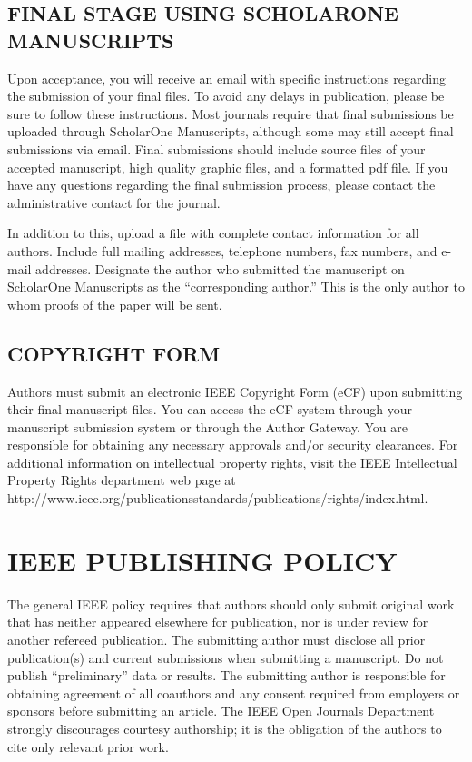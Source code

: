 \documentclass{ieeeojpel}
\begin{document}
\subsection{FINAL STAGE USING SCHOLARONE MANUSCRIPTS}
Upon acceptance, you will receive an email with specific instructions 
regarding the submission of your final files. To avoid any delays in 
publication, please be sure to follow these instructions. Most journals 
require that final submissions be uploaded through ScholarOne Manuscripts, 
although some may still accept final submissions via email. Final 
submissions should include source files of your accepted manuscript, high 
quality graphic files, and a formatted pdf file. If you have any questions 
regarding the final submission process, please contact the administrative 
contact for the journal. 

In addition to this, upload a file with complete contact information for all 
authors. Include full mailing addresses, telephone numbers, fax numbers, and 
e-mail addresses. Designate the author who submitted the manuscript on 
ScholarOne Manuscripts as the ``corresponding author.'' This is the only 
author to whom proofs of the paper will be sent. 

\subsection{COPYRIGHT FORM}
Authors must submit an electronic IEEE Copyright Form (eCF) upon submitting 
their final manuscript files. You can access the eCF system through your 
manuscript submission system or through the Author Gateway. You are 
responsible for obtaining any necessary approvals and/or security 
clearances. For additional information on intellectual property rights, 
visit the IEEE Intellectual Property Rights department web page at 
http://www.ieee.org/publications\textunderscore\discretionary{}{}{}standards/publications/rights/index.html. 

\section{IEEE PUBLISHING POLICY}
The general IEEE policy requires that authors should only submit original 
work that has neither appeared elsewhere for publication, nor is under 
review for another refereed publication. The submitting author must disclose 
all prior publication(s) and current submissions when submitting a 
manuscript. Do not publish ``preliminary'' data or results. The submitting 
author is responsible for obtaining agreement of all coauthors and any 
consent required from employers or sponsors before submitting an article. 
The IEEE Open Journals Department strongly discourages courtesy authorship; 
it is the obligation of the authors to cite only relevant prior work.
\end{document}
